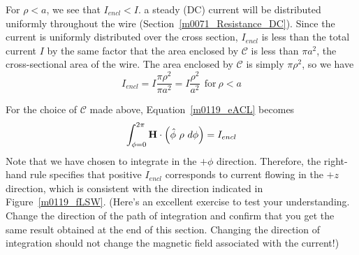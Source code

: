 For $\rho<a$, we see that $I_{encl}<I$.  
a steady (DC) current will be distributed uniformly throughout the wire (Section~\ref{m0071_Resistance_DC}).
Since the current is uniformly distributed over the cross section, $I_{encl}$ is less than the total current $I$ by the same factor that the area enclosed by ${\mathcal C}$ is less than $\pi a^2$, the cross-sectional area of the wire.
The area enclosed by ${\mathcal C}$ is simply $\pi \rho^2$, so we have
%
\begin{equation}
I_{encl}
=I \frac{\pi \rho^2}{\pi a^2}
=I \frac{\rho^2}{a^2} ~~ \mbox{for}~\rho<a
\end{equation}
 
For the choice of ${\mathcal C}$ made above, Equation~\ref{m0119_eACL} becomes
%
\begin{equation}   
\int_{\phi=0}^{2\pi} { {\bf H} \cdot \left(\hat{\bf \phi}~\rho~d\phi\right) } = I_{encl}
\label{m0119_eACL1}
\end{equation}
%
Note that we have chosen to integrate in the $+\phi$ direction.
Therefore, the right-hand rule 
specifies that positive $I_{encl}$ corresponds to current flowing in the $+z$ direction, which is consistent with the direction indicated in Figure~\ref{m0119_fLSW}.
(Here's an excellent exercise to test your understanding. Change the direction of the path of integration and confirm that you get the same result obtained at the end of this section.  Changing the direction of integration should not change the magnetic field associated with the current!)

